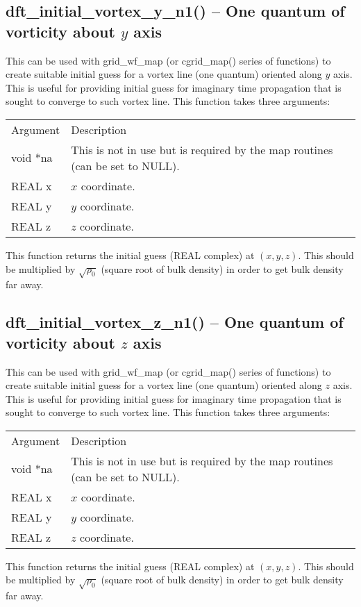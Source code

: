 \documentclass[12pt,letterpaper]{report}
\begin{document}
\subsection{dft\_initial\_vortex\_y\_n1() -- One quantum of vorticity about $y$ axis}

This can be used with grid\_wf\_map (or cgrid\_map() series of functions) to create suitable initial guess for a vortex line (one quantum) oriented along $y$ axis. This is useful for providing initial guess for imaginary time propagation that is sought to converge to such vortex line. This function takes three arguments:
\begin{longtable}{p{} p{}}
Argument & Description\\
\cline{1-2}
void *na & This is not in use but is required by the map routines (can be set to NULL).\\
REAL x & $x$ coordinate.\\
REAL y & $y$ coordinate.\\
REAL z & $z$ coordinate.\\
\end{longtable}
\noindent
This function returns the initial guess (REAL complex) at $(x, y, z)$. This should be multiplied by $\sqrt{\rho_0}$ (square root of bulk density) in order to get bulk density far away. 

\subsection{dft\_initial\_vortex\_z\_n1() -- One quantum of vorticity about $z$ axis}

This can be used with grid\_wf\_map (or cgrid\_map() series of functions) to create suitable initial guess for a vortex line (one quantum) oriented along $z$ axis. This is useful for providing initial guess for imaginary time propagation that is sought to converge to such vortex line. This function takes three arguments:
\begin{longtable}{p{} p{}}
Argument & Description\\
\cline{1-2}
void *na & This is not in use but is required by the map routines (can be set to NULL).\\
REAL x & $x$ coordinate.\\
REAL y & $y$ coordinate.\\
REAL z & $z$ coordinate.\\
\end{longtable}
\noindent
This function returns the initial guess (REAL complex) at $(x, y, z)$. This should be multiplied by $\sqrt{\rho_0}$ (square root of bulk density) in order to get bulk density far away. 
\end{document}
